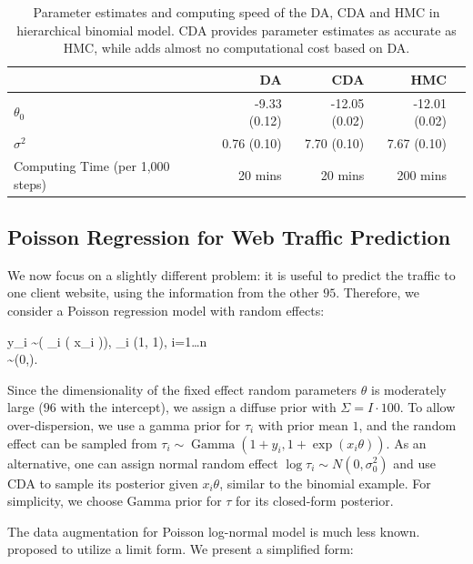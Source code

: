 \documentclass[10pt]{article}
\newcommand{\xbeta}{ x_i \theta}
\newcommand{\be}{\begin{equs}}
\newcommand{\ee}{\end{equs}}
\DeclareMathOperator{\No}{No}
\DeclareMathOperator{\Ga}{Gamma}
\DeclareMathOperator{\Poi}{Poisson}
\begin{document}
 
 
\begin{table}[H]
\centering
\begin{tabular}{|l |r |r| r| r |} 
 \hline
                          & DA & CDA & HMC\\
 [0.5ex]
 \hline
$\theta_0$                         & -9.33 (0.12)& -12.05 (0.02) &  -12.01 (0.02)\\
$\sigma^2$         & 0.76 (0.10)&   7.70 (0.10)  & 7.67 (0.10)\\
Computing Time (per 1,000 steps)  & 20 mins       & 20 mins        & 200 mins\\
 \hline
\end{tabular}
\caption{Parameter estimates and computing speed of the DA, CDA and HMC in hierarchical binomial model. CDA provides parameter estimates as accurate as HMC, while adds almost no computational cost based on DA.}
\label{tab:binomial}
\end{table}


\subsection{Poisson Regression for Web Traffic Prediction}

We now focus on a slightly different problem: it is useful to predict the traffic to one client website, using the information from the other $95$. Therefore, we consider a Poisson regression model with random effects:

\be
y_i \sim \Poi\left( \tau_i \exp  (\xbeta )\right),  \quad \tau_i \Ga(1, 1), \quad i=1\ldots n\\
\theta \sim  \No(0,\Sigma).
\ee

Since the dimensionality of the fixed effect random parameters $\theta$ is moderately large ($96$ with the intercept), we assign a diffuse prior with $\Sigma= I\cdot 100$. To allow over-dispersion, we use a gamma prior for $\tau_i$ with prior mean $1$, and the random effect can be sampled from $\tau_i \sim \Ga\left(1+y_i, 1+\exp(\xbeta) \right)$. As an alternative, one can assign normal random effect $\log \tau_i \sim N(0,\sigma^2_0)$ and use CDA to sample its posterior given $\xbeta$, similar to the binomial example. For simplicity, we choose Gamma prior for $\tau$ for its closed-form posterior.

The data augmentation for Poisson log-normal model is much less known. \cite{zhou2012lognormal} proposed to utilize a limit form. We present a simplified form:
\end{document}
